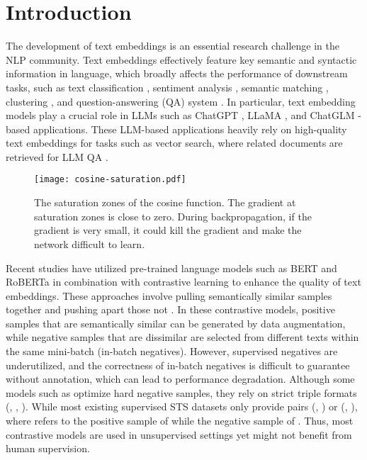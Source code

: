 \documentclass{article} \usepackage{iclr2024_conference,times}
\begin{document}
\section{Introduction}
The development of text embeddings \citep{skipthought-ryan-2015,DBLP:conf/naacl/HillCK16,conneau-etal-2017-supervised,cer-etal-2018-universal,sbert-nils-2019,simcse_gao_2021} is an essential research challenge in the NLP community. 
Text embeddings effectively feature key semantic and syntactic information in language, which broadly affects the performance of downstream tasks, such as text classification \citep{li2021merging}, sentiment analysis \citep{suresh-ong-2021-negatives,zhang2022leveraging}, semantic matching \citep{grill2020bootstrap,lu2020deep}, clustering \citep{sbert-nils-2019,contrastive_review_xu_2023}, and question-answering (QA) system \citep{yue-etal-2021-contrastive}. 
In particular, text embedding models play a crucial role in LLMs such as ChatGPT \citep{chatgpt, gpt4}, LLaMA \citep{touvron2023llama, touvron2023llama2}, and ChatGLM \citep{du2022glm}-based applications. These LLM-based applications heavily rely on high-quality text embeddings for tasks such as vector search, where related documents are retrieved for LLM QA \citep{asai-etal-2023-retrieval}. 
\begin{figure}[ht]
    \centering
\texttt{[image: cosine-saturation.pdf]}
    \caption{The saturation zones of the cosine function. The gradient at saturation zones is close to zero. During backpropagation, if the gradient is very small, it could kill the gradient and make the network difficult to learn.}
    \label{cosine-saturation-zone-figure}
\end{figure}

Recent studies \citep{simcse_gao_2021,promcse_jiang_2022,chuang-etal-2022-diffcse,chanchani-huang-2023-composition,zhuo-etal-2023-whitenedcse} have utilized pre-trained language models such as BERT \citep{DevlinCLT19BERT} and RoBERTa \citep{roberta-liu-2019} in combination with contrastive learning to enhance the quality of text embeddings. These approaches involve pulling semantically similar samples together and pushing apart those not \citep{simcse_gao_2021}. 
In these contrastive models, positive samples that are semantically similar can be generated by data augmentation, while negative samples that are dissimilar are selected from different texts within the same mini-batch (in-batch negatives). However, supervised negatives are underutilized, and the correctness of in-batch negatives is difficult to guarantee without annotation, which can lead to performance degradation. Although some models such as \citep{simcse_gao_2021} optimize hard negative samples, they rely on strict triple formats (, , ). While most existing supervised STS datasets only provide pairs (, ) or (, ), where  refers to the positive sample of  while  the negative sample of .
Thus, most contrastive models are used in unsupervised settings yet might not benefit from human supervision.
\end{document}

